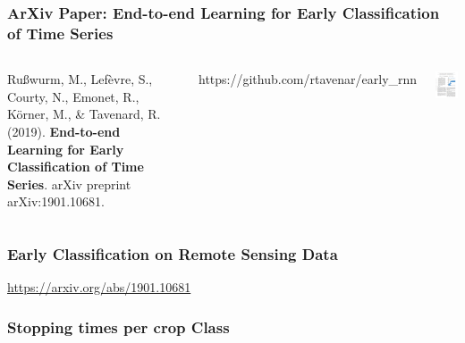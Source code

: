 \begin{frame}
\frametitle{ArXiv Paper: End-to-end Learning for Early Classification of Time Series}

\begin{columns}
	
	
	
	Rußwurm, M., Lefèvre, S., Courty, N., Emonet, R., Körner, M., \& Tavenard, R. (2019).\textbf{ End-to-end Learning for Early Classification of Time Series}. arXiv preprint arXiv:1901.10681.
	
	\vspace{1em}
	https://github.com/rtavenar/early\_rnn
	
	
	\includegraphics[width=4cm]{images/elects_arxiv}
	
\end{columns}

\end{frame}



%	
%	
%	


\begin{frame}
\frametitle{Early Classification on Remote Sensing Data}


\url{https://arxiv.org/abs/1901.10681}


\end{frame}

\begin{frame}
	\frametitle{Stopping times per crop Class}
	
	
	
\end{frame}

